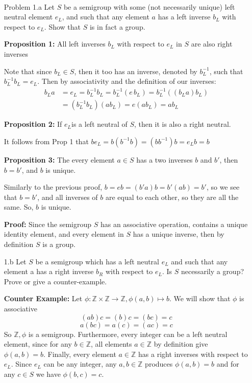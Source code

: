 \documentclass[letterpaper]{article}
\newcommand{\Integers}{\mathbb{Z}}
\begin{document}
 \\
\begin{itemize}
      \item[Problem 1.a] Let \(S\) be a semigroup with some (not necessarily unique) left neutral element \(e_L\), and such that any element \(a\) has a left inverse \(b_L\) with respect to \(e_L\). Show that \(S\) is in fact a group.

            \textbf{Proposition 1:} All left inverses \(b_L\) with respect to \(e_L\) in \(S\) are also right inverses

            Note that since \(b_L \in S\), then it too has an inverse, denoted by \(b_{L}^{-1}\), such that \(b_{L}^{-1}b_{L} = e_{L}\). Then by associativity and the definition of our inverses:
            \begin{align*}
                  b_{L}a & = e_L = b_{L}^{-1}b_L = b_{L}^{-1}(e\,b_L) = b_{L}^{-1}((b_{L}a)b_L) \\ & = (b_{L}^{-1}b_L)(ab_L) = e(ab_L) = ab_L
            \end{align*}

            \textbf{Proposition 2: } If \(e_{L}\)is a left neutral of \(S\), then it is also a right neutral.

            It follows from Prop 1 that \(be_L = b(b^{-1}b) = (bb^{-1})b = e_Lb = b\)

            \textbf{Proposition 3: } The every element \(a \in S\) has a two inverses \(b\) and \(b'\), then \(b = b'\), and \(b\) is unique.

            Similarly to the previous proof, \(b = eb = (b'a)b = b'(ab) = b'\), so we see that \(b = b'\), and all inverses of \(b\) are equal to each other, so they are all the same. So, \(b\) is unique.

            \textbf{Proof: } Since the semigroup \(S\) has an associative operation, contains a unique identity element, and every element in \(S\) has a unique inverse, then by definition \(S\) is a group.

      \item[1.b] Let \(S\) be a semigroup which has a left neutral \(e_L\) and such that any element a has a right inverse \(b_R\) with respect to \(e_L\). Is \(S\) necessarily a group? Prove or give a counter-example.

            \textbf{Counter Example: } Let \(\phi: \Integers \times \Integers \rightarrow \Integers, \phi(a, b) \mapsto b\). We will show that  \(\phi\) is associative \[(ab)c = (b)c = (bc) = c\] \[a(bc) = a(c) = (ac) = c\]
            So \(\Integers, \phi\) is a semigroup. Furthermore, every integer can be a left neutral element, since for any \(b \in \Integers\), all elements \(a \in \Integers\) by definition give \(\phi(a, b) = b\).
            Finally, every element \(a \in \Integers\) has a right inverses with respect to \(e_L\). Since \(e_L\) can be any integer, any \(a, b \in \Integers\) produces \(\phi(a,b) = b\) and for any \(c \in S\) we have \(\phi(b, c) = c\).


\end{itemize}
\end{document}
